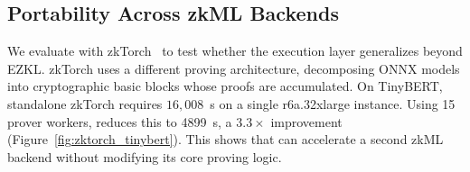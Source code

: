 \subsection{Portability Across zkML Backends}
\label{subsec:extendingtoothersystems}

We evaluate \TITLE{} with zkTorch~\cite{chen2025zktorch} to test whether the execution layer generalizes beyond EZKL. zkTorch uses a different proving architecture, decomposing ONNX models into cryptographic basic blocks whose proofs are accumulated.
On TinyBERT, standalone zkTorch requires \(16{,}008\)~s on a single r6a.32xlarge instance. Using 15 prover workers, \TITLE{} reduces this to \num{4899}~s, a \(3.3\times\) improvement (Figure~\ref{fig:zktorch_tinybert}). This shows that \TITLE{} can accelerate a second zkML backend without modifying its core proving logic.





